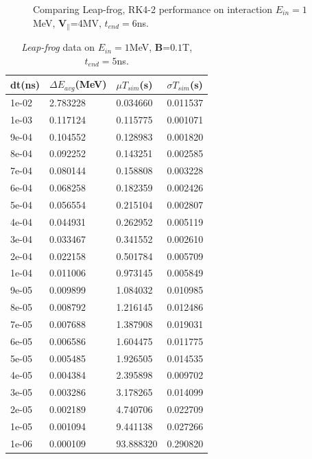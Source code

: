 \documentclass[a4paper,oneside,12pt]{report}
\numberwithin{equation}{chapter}
\begin{document}
{\begin{figure}[H]
    \vspace{20pt}
    \caption{\centering Comparing Leap-frog, RK4-2 performance on \eE interaction $E_{in}=1$MeV, $\textbf{V}_{\parallel}$=4MV, $t_{end}=6$ns.} 
    \label{fig:lf_rk2_par_stat_E_comparison}
\end{figure}

\begin{table}[H]
    \centering
    \caption{\textit{Leap-frog} data on $E_{in}=1$MeV, \textbf{B}=$0.1$T, $t_{end}=5$ns.}
    \vspace{10pt}
    \begin{tabular}{|l|l|l|l|}
    \hline
    dt(ns)       & $\Delta E_{avg}$(MeV) & $\mu T_{sim}$(s)    & $\sigma T_{sim}$(s) \\\hline
        1e-02 & 2.783228     & 0.034660  & 0.011537 \\ \hline
        1e-03 & 0.117124     & 0.115775  & 0.001071 \\ \hline
        9e-04 & 0.104552     & 0.128983  & 0.001820 \\  \hline
        8e-04 & 0.092252     & 0.143251  & 0.002585 \\ \hline
        7e-04 & 0.080144     & 0.158808  & 0.003228 \\ \hline
        6e-04 & 0.068258     & 0.182359  & 0.002426 \\\hline
        5e-04 & 0.056554     & 0.215104  & 0.002807 \\\hline
        4e-04 & 0.044931     & 0.262952  & 0.005119 \\\hline
        3e-04 & 0.033467     & 0.341552  & 0.002610 \\\hline
        2e-04 & 0.022158     & 0.501784  & 0.005709 \\\hline
        1e-04 & 0.011006     & 0.973145  & 0.005849 \\\hline
        9e-05 & 0.009899     & 1.084032  & 0.010985 \\\hline
        8e-05 & 0.008792     & 1.216145  & 0.012486 \\\hline
        7e-05 & 0.007688     & 1.387908  & 0.019031 \\\hline
        6e-05 & 0.006586     & 1.604475  & 0.011775 \\\hline
        5e-05 & 0.005485     & 1.926505  & 0.014535 \\\hline
        4e-05 & 0.004384     & 2.395898  & 0.009702 \\\hline
        3e-05 & 0.003286     & 3.178265  & 0.014099 \\\hline
        2e-05 & 0.002189     & 4.740706  & 0.022709 \\\hline
        1e-05 & 0.001094     & 9.441138  & 0.027266 \\\hline
        1e-06 & 0.000109     & 93.888320 & 0.290820 \\ \hline
    \end{tabular}
    \label{tab:lf_mag_table}
\end{table}

}
\end{document}
